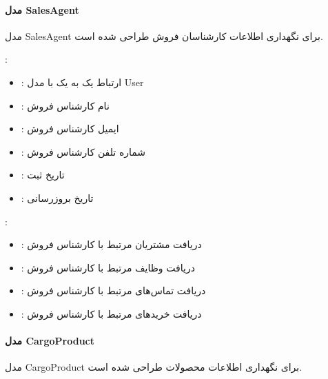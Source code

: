 \documentclass[letterpaper,10pt,english]{sphinxmanual}
\begin{document}
\paragraph{مدل SalesAgent}
\label{\detokenize{modules/core:salesagent}}
\sphinxAtStartPar
مدل SalesAgent برای نگهداری اطلاعات کارشناسان فروش طراحی شده است.

\sphinxAtStartPar
{}:
\begin{itemize}
\item {} 
\sphinxAtStartPar
{}: ارتباط یک به یک با مدل User

\item {} 
\sphinxAtStartPar
{}: نام کارشناس فروش

\item {} 
\sphinxAtStartPar
{}: ایمیل کارشناس فروش

\item {} 
\sphinxAtStartPar
{}: شماره تلفن کارشناس فروش

\item {} 
\sphinxAtStartPar
{}: تاریخ ثبت

\item {} 
\sphinxAtStartPar
{}: تاریخ بروزرسانی

\end{itemize}

\sphinxAtStartPar
{}:
\begin{itemize}
\item {} 
\sphinxAtStartPar
{}: دریافت مشتریان مرتبط با کارشناس فروش

\item {} 
\sphinxAtStartPar
{}: دریافت وظایف مرتبط با کارشناس فروش

\item {} 
\sphinxAtStartPar
{}: دریافت تماس‌های مرتبط با کارشناس فروش

\item {} 
\sphinxAtStartPar
{}: دریافت خریدهای مرتبط با کارشناس فروش

\end{itemize}


\paragraph{مدل CargoProduct}
\label{\detokenize{modules/core:cargoproduct}}
\sphinxAtStartPar
مدل CargoProduct برای نگهداری اطلاعات محصولات طراحی شده است.
\end{document}
